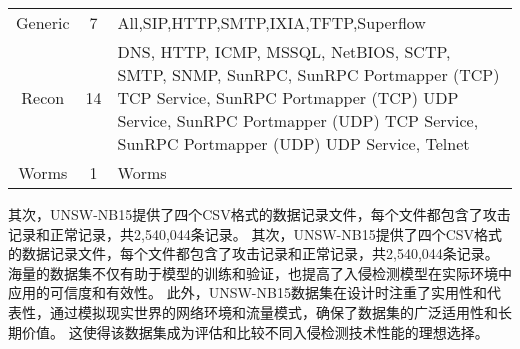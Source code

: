 \begin{table}[htbp]
\begin{tabularx}{\textwidth}{@{}ccX@{}}
		Generic                           & 7                                 & All,SIP,HTTP,SMTP,IXIA,TFTP,Superflow                                                                                                                                                                                                                                                                                                                                                                                                                                                                                                                               \\
		Recon                             & 14                                & DNS, HTTP, ICMP, MSSQL, NetBIOS, SCTP, SMTP, SNMP, SunRPC, SunRPC Portmapper (TCP) TCP Service, SunRPC Portmapper (TCP) UDP Service, SunRPC Portmapper (UDP) TCP Service, SunRPC Portmapper (UDP) UDP Service, Telnet                                                                                                                                                                                                                                                                                                                                               \\
		Worms                             & 1                                 & Worms                                                                                                                                                                                                                                                                                                                                                                                                                                                                                                                                                               \\
		\bottomrule
	\end{tabularx}
\end{table}\par

其次，UNSW-NB15提供了四个CSV格式的数据记录文件，每个文件都包含了攻击记录和正常记录，共2,540,044条记录。
其次，UNSW-NB15提供了四个CSV格式的数据记录文件，每个文件都包含了攻击记录和正常记录，共2,540,044条记录。
海量的数据集不仅有助于模型的训练和验证，也提高了入侵检测模型在实际环境中应用的可信度和有效性。
此外，UNSW-NB15数据集在设计时注重了实用性和代表性，通过模拟现实世界的网络环境和流量模式，确保了数据集的广泛适用性和长期价值。
这使得该数据集成为评估和比较不同入侵检测技术性能的理想选择。\par

